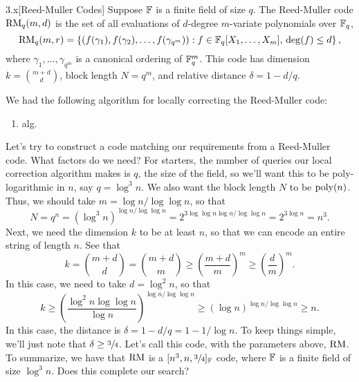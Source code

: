 \documentclass[11pt]{article}
\begin{document}
\begin{definition}{3.x}[Reed-Muller Codes]
    Suppose $\mathbb{F}$ is a finite field of size $q$. The Reed-Muller code $\mathrm{RM}_q(m, d)$ is the set of all evaluations of $d$-degree $m$-variate polynomials over $\mathbb{F}_q$,
    \begin{equation*}
        \mathrm{RM}_q(m ,r) = \left\{(f(\gamma_1), f(\gamma_2), \ldots, f(\gamma_{q^m})) : f \in \mathbb{F}_q[X_1, \ldots, X_m], \, \deg (f) \leq d\right\},
    \end{equation*}
    where $\gamma_1, \ldots, \gamma_{q^m}$ is a canonical ordering of $\mathbb{F}_q^m$. This code has dimension $k = \binom{m + d}{d}$, block length $N = q^m$, and relative distance $\delta = 1 - d/ q$.
\end{definition}

We had the following algorithm for locally correcting the Reed-Muller code:

\begin{enumerate}
    \item alg.
\end{enumerate}

Let's try to construct a code matching our requirements from a Reed-Muller code. What factors do we need? For starters, the number of queries our local correction algorithm makes is $q$, the size of the field, so we'll want this to be poly-logarithmic in $n$, say $q = \log^3 n$. We also want the block length $N$ to be $\mathrm{poly}(n)$. Thus, we should take $m = \log n / \log \log n$, so that 
\begin{equation*}
    N = q^n = \left(\log^3 n\right)^{\log n / \log \log n} = 2^{3\log \log n \log n / \log \log n} = 2^{3\log n} = n^3.
\end{equation*}
Next, we need the dimension $k$ to be at least $n$, so that we can encode an entire string of length $n$. See that 
\begin{equation*}
    k = \binom{m + d}{d} = \binom{m + d}{m} \geq \left(\frac{m + d}{m}\right)^{m} \geq \left(\frac{d}{m}\right)^{m}.
\end{equation*}
In this case, we need to take $d = \log^2 n$, so that 
\begin{equation*}
    k \geq \left(\frac{\log^2 n \log \log n}{\log n}\right)^{\log n / \log \log n} \geq \left(\log n\right)^{\log n / \log \log n} \geq n.
\end{equation*}
In this case, the distance is $\delta = 1 - d / q = 1 - 1 / \log n$. To keep things simple, we'll just note that $\delta \geq \sfrac{3}{4}$. Let's call this code, with the parameters above, $\mathrm{RM}$. To summarize, we have that $\mathrm{RM}$ is a $[n^3, n, \sfrac{3}{4}]_{\mathbb{F}}$ code, where $\mathbb{F}$ is a finite field of size $\log^3 n$. Does this complete our search?
\end{document}
